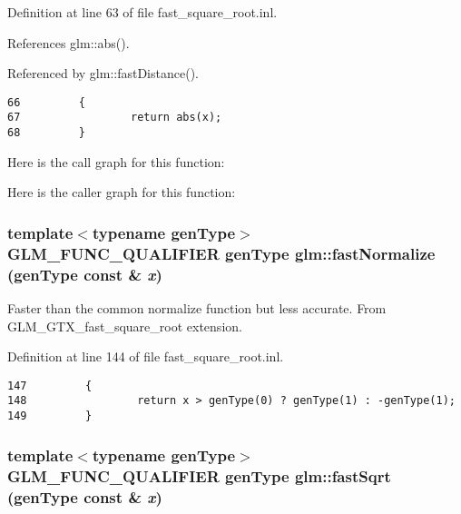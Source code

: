 Definition at line 63 of file fast\_\-square\_\-root.inl.

References glm::abs().

Referenced by glm::fastDistance().

\begin{Code}\begin{verbatim}66         {
67                 return abs(x);
68         }
\end{verbatim}
\end{Code}




Here is the call graph for this function:

Here is the caller graph for this function:\hypertarget{group__gtx__fast__square__root_g06fee9a90e853107e9d70d690dccf478}{
\subsubsection[fastNormalize]{\setlength{\rightskip}{0pt plus 5cm}template$<$typename genType$>$ GLM\_\-FUNC\_\-QUALIFIER genType glm::fastNormalize (genType const \& {\em x})}}
\label{group__gtx__fast__square__root_g06fee9a90e853107e9d70d690dccf478}


Faster than the common normalize function but less accurate. From GLM\_\-GTX\_\-fast\_\-square\_\-root extension. 

Definition at line 144 of file fast\_\-square\_\-root.inl.

\begin{Code}\begin{verbatim}147         {
148                 return x > genType(0) ? genType(1) : -genType(1);
149         }
\end{verbatim}
\end{Code}


\hypertarget{group__gtx__fast__square__root_g4a192efe46a74d13ab40067f7e3714e3}{
\subsubsection[fastSqrt]{\setlength{\rightskip}{0pt plus 5cm}template$<$typename genType$>$ GLM\_\-FUNC\_\-QUALIFIER genType glm::fastSqrt (genType const \& {\em x})}}
\label{group__gtx__fast__square__root_g4a192efe46a74d13ab40067f7e3714e3}


